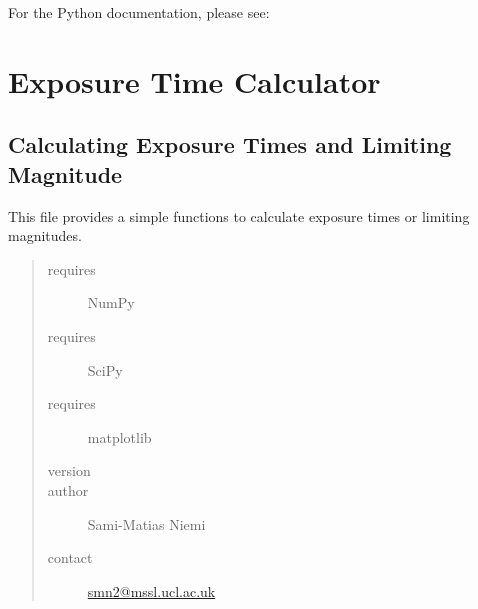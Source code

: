 \documentclass[a4paper,12pt,english]{sphinxmanual}
\begin{document}
For the Python documentation, please see:


\section{Exposure Time Calculator}
\label{ETC:module-analysis.ETC}\label{ETC:exposure-time-calculator}\label{ETC::doc}

\subsection{Calculating Exposure Times and Limiting Magnitude}
\label{ETC:calculating-exposure-times-and-limiting-magnitude}
This file provides a simple functions to calculate exposure times or limiting magnitudes.
\begin{quote}\begin{description}
\item[{requires}] \leavevmode
NumPy

\item[{requires}] \leavevmode
SciPy

\item[{requires}] \leavevmode
matplotlib

\item[{version}] 

\item[{author}] \leavevmode
Sami-Matias Niemi

\item[{contact}] \leavevmode
\href{mailto:smn2@mssl.ucl.ac.uk}{smn2@mssl.ucl.ac.uk}

\end{description}\end{quote}
\end{document}
